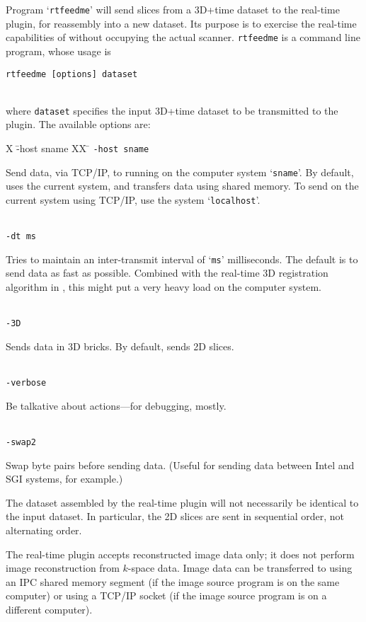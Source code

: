 Program `{\tt rtfeedme}' will send slices from a 3D+time dataset to the \afnit
real-time plugin, for reassembly into a new dataset.  Its purpose is
to exercise the real-time capabilities of \afnit without occupying the
actual scanner.  {\tt rtfeedme} is a command line program, whose
usage is\\[-1ex]
\centerline{\tt rtfeedme [options] dataset}\\[1ex]
where {\tt dataset} specifies the input \afnit 3D+time dataset to be
transmitted to the plugin.  The available options are:\\[-4ex]
\begin{tabbing}
  X \= -host sname XX \= \kill
  \> {\tt -host sname} \> \parbox[t]{5.05in}{
                             Send data, via TCP/IP, to \afnit running on the
                             computer system `{\tt sname}'.  By default, uses the
                             current system, and transfers data using shared
                             memory.  To send on the current system using
                             TCP/IP, use the system `{\tt localhost}'.} \\[1ex]
%
  \> {\tt -dt ms}      \> \parbox[t]{5.05in}{
                             Tries to maintain an inter-transmit interval of
                             `{\tt ms}' milliseconds.
                            The default is to send data as fast as possible.
                            Combined with the real-time 3D registration algorithm
                            in \afni, this might put a very heavy load on the
                            computer system.} \\[1ex]
%
  \> {\tt -3D}         \> \parbox[t]{5.05in}{
                            Sends data in 3D bricks.  By default, sends
                            2D slices.} \\[1ex]
%
  \> {\tt -verbose}    \>  \parbox[t]{5.05in}{Be talkative about actions---for
                                             debugging, mostly.} \\[1ex]
%
  \> {\tt -swap2}      \>  \parbox[t]{5.05in}{
                              Swap byte pairs before sending data.
                              (Useful for sending data between Intel and SGI
                               systems, for example.)}
\end{tabbing}
The dataset assembled by the real-time plugin will not necessarily
be identical to the input dataset.  In particular, the 2D slices are
sent in sequential order, not alternating order.

The real-time plugin accepts reconstructed image data only; it does not
perform image reconstruction from $k$-space data.  Image data can be transferred
to \afnit using an IPC shared memory segment (if the image source
program is on the same computer) or using a TCP/IP socket (if the image source
program is on a different computer).


